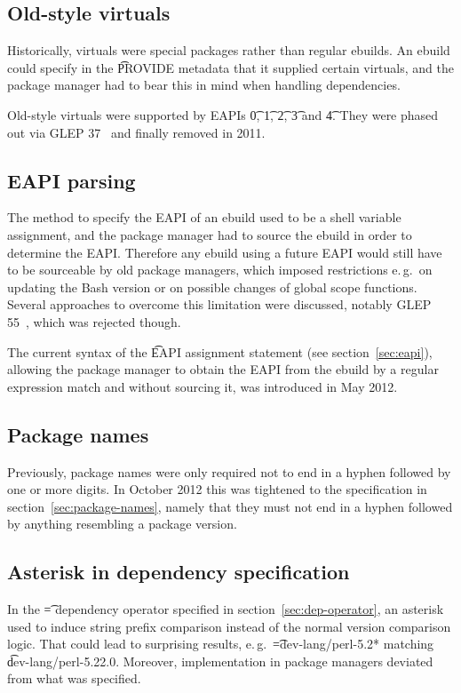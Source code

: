 \subsection{Old-style virtuals}
Historically, virtuals were special packages rather than regular ebuilds. An ebuild could specify in
the \t{PROVIDE} metadata that it supplied certain virtuals, and the package manager had to bear this
in mind when handling dependencies.

Old-style virtuals were supported by EAPIs \t{0}, \t{1}, \t{2}, \t{3} and \t{4}. They were phased
out via GLEP 37~\cite{Glep37} and finally removed in 2011.

\subsection{EAPI parsing}
The method to specify the EAPI of an ebuild used to be a shell variable assignment, and the package
manager had to source the ebuild in order to determine the EAPI\@. Therefore any ebuild using
a future EAPI would still have to be sourceable by old package managers, which imposed restrictions
e.\,g.\ on updating the Bash version or on possible changes of global scope functions. Several
approaches to overcome this limitation were discussed, notably GLEP 55~\cite{Glep55}, which was
rejected though.

The current syntax of the \t{EAPI} assignment statement (see section~\ref{sec:eapi}), allowing
the package manager to obtain the EAPI from the ebuild by a regular expression match and without
sourcing it, was introduced in May 2012.

\subsection{Package names}
Previously, package names were only required not to end in a hyphen followed by one or more digits.
In October 2012 this was tightened to the specification in section~\ref{sec:package-names}, namely
that they must not end in a hyphen followed by anything resembling a package version.

\subsection{Asterisk in dependency specification}
In the \t{=} dependency operator specified in section~\ref{sec:dep-operator}, an asterisk used to
induce string prefix comparison instead of the normal version comparison logic. That could lead to
surprising results, e.\,g.\ \t{=dev-lang/perl-5.2*} matching \t{dev-lang/perl-5.22.0}. Moreover,
implementation in package managers deviated from what was specified.

